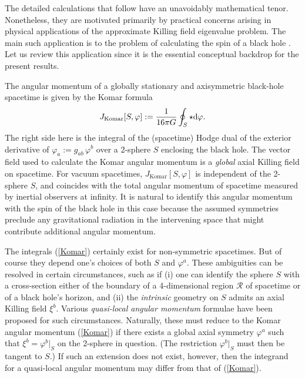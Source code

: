 \documentclass[12pt,letterpaper]{iopart}
\newcommand\defn[1]{{\slshape #1\/}}
\begin{document}
The detailed calculations that follow have an unavoidably mathematical tenor.  Nonetheless, they are motivated primarily by practical concerns arising in physical applications of the approximate Killing field eigenvalue problem.  The main such application is to the problem of calculating the spin of a black hole \cite{Lovelace,CookWhiting,Beetle}.  Let us review this application since it is the essential conceptual backdrop for the present results.

The angular momentum of a globally stationary and axisymmetric black-hole spacetime is given by the Komar formula \cite{Komar,Wald} 
%
\begin{equation}\label{Komar}
	J_{\mathrm{Komar}}[S, \varphi] := \frac{1}{16 \pi G} \oint_S \star \mathrm{d} \varphi.
\end{equation}
%
The right side here is the integral of the (spacetime) Hodge dual of the exterior derivative of $\varphi_a := g_{ab}\, \varphi^b$ over a 2-sphere $S$ enclosing the black hole.  The vector field used to calculate the Komar angular momentum is a \textit{global} axial Killing field on spacetime.  For vacuum spacetimes, $J_{\mathrm{Komar}}[S, \varphi]$ is independent of the 2-sphere $S$, and coincides with the total angular momentum of spacetime measured by inertial observers at infinity.  It is natural to identify this angular momentum with the spin of the black hole in this case because the assumed symmetries preclude any gravitational radiation in the intervening space that might contribute additional angular momentum.

The integrals (\ref{Komar}) certainly exist for non-symmetric spacetimes.  But of course they depend one's choices of both $S$ and $\varphi^a$.  These ambiguities can be resolved in certain circumstances, such as if (i) one can identify the sphere $S$ with a cross-section either of the boundary of a 4-dimensional region $\mathcal{R}$ of spacetime or of a black hole's horizon, and (ii) the \textit{intrinsic} geometry on $S$ admits an axial Killing field $\xi^b$.  Various \defn{quasi-local angular momentum} formulae have been proposed for such circumstances.  Naturally, these must reduce to the Komar angular momentum (\ref{Komar}) if there exists a global axial symmetry $\varphi^a$ such that $\xi^b = \varphi^b \bigr|_S$ on the 2-sphere in question.  (The restriction $\varphi^b \bigr|_S$ must then be tangent to $S$.)  If such an extension does not exist, however, then the integrand for a quasi-local angular momentum may differ from that of (\ref{Komar}).
\end{document}
